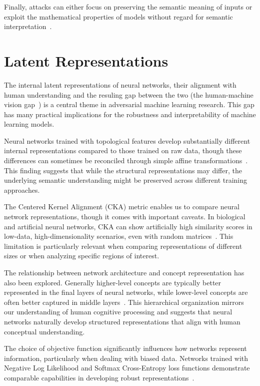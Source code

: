 \documentclass[a4paper, oneside]{discothesis}
\begin{document}
Finally, attacks can either focus on preserving the semantic meaning of inputs or exploit the mathematical properties of models without regard for semantic interpretation~\cite{browne2020semantics}.

\section{Latent Representations}

The internal latent representations of neural networks, their alignment with human understanding and the resuling gap between the two (the human-machine vision gap~\cite{geirhos2021partial}) is a central theme in adversarial machine learning research. This gap has many practical implications for the robustness and interpretability of machine learning models.

Neural networks trained with topological features develop substantially different internal representations compared to those trained on raw data, though these differences can sometimes be reconciled through simple affine transformations~\cite{mcguire2023neural}. This finding suggests that while the structural representations may differ, the underlying semantic understanding might be preserved across different training approaches.

The Centered Kernel Alignment (CKA) metric enables us to compare neural network representations, though it comes with important caveats. In biological and artificial neural networks, CKA can show artificially high similarity scores in low-data, high-dimensionality scenarios, even with random matrices~\cite{murphy2024correcting}. This limitation is particularly relevant when comparing representations of different sizes or when analyzing specific regions of interest.

The relationship between network architecture and concept representation has also been explored. Generally higher-level concepts are typically better represented in the final layers of neural networks, while lower-level concepts are often better captured in middle layers~\cite{Agafonov2022AnEO, Agafonov2022LocalizationOO}. This hierarchical organization mirrors our understanding of human cognitive processing and suggests that neural networks naturally develop structured representations that align with human conceptual understanding.

The choice of objective function significantly influences how networks represent information, particularly when dealing with biased data. Networks trained with Negative Log Likelihood and Softmax Cross-Entropy loss functions demonstrate comparable capabilities in developing robust representations~\cite{bangaru2022interpreting}.
\end{document}
